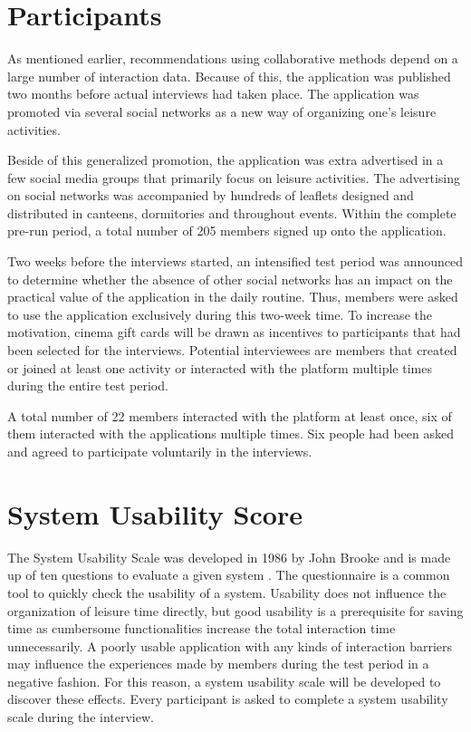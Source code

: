 \documentclass[12pt,numbers=noenddot,parskip,bibliography=totocnumbered,listof=totocnumbered,draft]{scrreprt}
\begin{document}
\section{Participants}
As mentioned earlier, recommendations using collaborative methods depend on a large number of interaction data. Because of this, the application was published two months before actual interviews had taken place. The application was promoted via several social networks as a new way of organizing one's leisure activities.

Beside of this generalized promotion, the application was extra advertised in a few social media groups that primarily focus on leisure activities. The advertising on social networks was accompanied by hundreds of leaflets designed and distributed in canteens, dormitories and throughout events. Within the complete pre-run period, a total number of 205 members signed up onto the application.

Two weeks before the interviews started, an intensified test period was announced to determine whether the absence of other social networks has an impact on the practical value of the application in the daily routine. Thus, members were asked to use the application exclusively during this two-week time. To increase the motivation, cinema gift cards will be drawn as incentives to participants that had been selected for the interviews. Potential interviewees are members that created or joined at least one activity or interacted with the platform multiple times during the entire test period.

A total number of 22 members interacted with the platform at least once, six of them interacted with the applications multiple times. Six people had been asked and agreed to participate voluntarily in the interviews.

\section{System Usability Score}
The System Usability Scale was developed in 1986 by John Brooke and is made up of ten questions to evaluate a given system \citep[p.189-194]{brooke1996}. The questionnaire is a common tool to quickly check the usability of a system. Usability does not influence the organization of leisure time directly, but good usability is a prerequisite for saving time as cumbersome functionalities increase the total interaction time unnecessarily. A poorly usable application with any kinds of interaction barriers may influence the experiences made by members during the test period in a negative fashion. For this reason, a system usability scale will be developed to discover these effects. Every participant is asked to complete a system usability scale during the interview.
\end{document}

